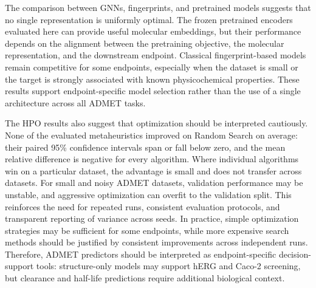 \documentclass[journal]{IEEEtran}
\begin{document}
The comparison between GNNs, fingerprints, and pretrained models suggests that no single representation is uniformly optimal. The frozen pretrained encoders evaluated here can provide useful molecular embeddings, but their performance depends on the alignment between the pretraining objective, the molecular representation, and the downstream endpoint. Classical fingerprint-based models remain competitive for some endpoints, especially when the dataset is small or the target is strongly associated with known physicochemical properties. These results support endpoint-specific model selection rather than the use of a single architecture across all ADMET tasks.

The HPO results also suggest that optimization should be interpreted cautiously. None of the evaluated metaheuristics improved on Random Search on average: their paired 95\% confidence intervals span or fall below zero, and the mean relative difference is negative for every algorithm. Where individual algorithms win on a particular dataset, the advantage is small and does not transfer across datasets. For small and noisy ADMET datasets, validation performance may be unstable, and aggressive optimization can overfit to the validation split. This reinforces the need for repeated runs, consistent evaluation protocols, and transparent reporting of variance across seeds. In practice, simple optimization strategies may be sufficient for some endpoints, while more expensive search methods should be justified by consistent improvements across independent runs. Therefore, ADMET predictors should be interpreted as endpoint-specific decision-support tools: structure-only models may support hERG and Caco-2 screening, but clearance and half-life predictions require additional biological context.
\end{document}
